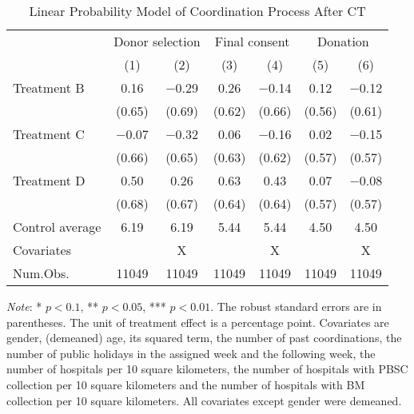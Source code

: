 \documentclass[12pt, a4paper]{article}
\begin{document}
\begin{table}

\caption{\label{tab:lm-coordinate}Linear Probability Model of Coordination Process After CT}
\centering
\fontsize{8}{10}\selectfont
\begin{threeparttable}
\begin{tabular}[t]{lcccccc}
\toprule
\multicolumn{1}{c}{ } & \multicolumn{2}{c}{Donor selection} & \multicolumn{2}{c}{Final consent} & \multicolumn{2}{c}{Donation} \\
\cmidrule(l{3pt}r{3pt}){2-3} \cmidrule(l{3pt}r{3pt}){4-5} \cmidrule(l{3pt}r{3pt}){6-7}
  & (1) & (2) & (3) & (4) & (5) & (6)\\
\midrule
Treatment B & \num{0.16} & \num{-0.29} & \num{0.26} & \num{-0.14} & \num{0.12} & \num{-0.12}\\
 & (\num{0.65}) & (\num{0.69}) & (\num{0.62}) & (\num{0.66}) & (\num{0.56}) & (\num{0.61})\\
Treatment C & \num{-0.07} & \num{-0.32} & \num{0.06} & \num{-0.16} & \num{0.02} & \num{-0.15}\\
 & (\num{0.66}) & (\num{0.65}) & (\num{0.63}) & (\num{0.62}) & (\num{0.57}) & (\num{0.57})\\
Treatment D & \num{0.50} & \num{0.26} & \num{0.63} & \num{0.43} & \num{0.07} & \num{-0.08}\\
 & (\num{0.68}) & (\num{0.67}) & (\num{0.64}) & (\num{0.64}) & (\num{0.57}) & (\num{0.57})\\
\midrule
Control average & 6.19 & 6.19 & 5.44 & 5.44 & 4.50 & 4.50\\
Covariates &  & X &  & X &  & X\\
Num.Obs. & \num{11049} & \num{11049} & \num{11049} & \num{11049} & \num{11049} & \num{11049}\\
\bottomrule
\end{tabular}
\begin{tablenotes}
\item \emph{Note}: * $p < 0.1$, ** $p < 0.05$, *** $p < 0.01$. The robust standard errors are in parentheses. The unit of treatment effect is a percentage point. Covariates are gender, (demeaned) age, its squared term, the number of past coordinations, the number of public holidays in the assigned week and the following week, the number of hospitals per 10 square kilometers, the number of hospitals with PBSC collection per 10 square kilometers and the number of hospitals with BM collection per 10 square kilometers. All covariates except gender were demeaned.
\end{tablenotes}
\end{threeparttable}
\end{table}
\end{document}
